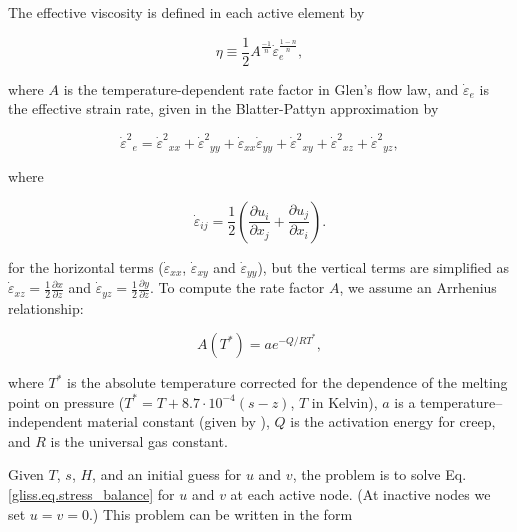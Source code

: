 The effective viscosity is defined in each active element by

\begin{equation}
  \label{gliss.eq.effective_viscosity}
  \eta \equiv \frac{1}{2} A^{\frac{-1}{n}} \dot{\varepsilon }_{e}^{\frac{1-n}{n}},
\end{equation}

\noindent
where $A$ is the temperature-dependent rate factor in Glen's flow law, and $\dot{\varepsilon }_{e}$ is the effective strain rate,
given in the Blatter-Pattyn approximation by 

\begin{equation}
  \label{gliss.eq.effective_strain_rate}
        {{\dot{\varepsilon }}^{2}}_{e}={{\dot{\varepsilon }}^{2}}_{xx}+{{\dot{\varepsilon }}^{2}}_{yy}+{{\dot{\varepsilon }}_{xx}}{{\dot{\varepsilon }}_{yy}}+{{\dot{\varepsilon }}^{2}}_{xy}+{{\dot{\varepsilon }}^{2}}_{xz}+{{\dot{\varepsilon }}^{2}}_{yz},
\end{equation}

\noindent
where

\begin{equation}
  \dot{\varepsilon }_{ij} = \frac{1}{2}\left( \frac{\partial u_{i}}{\partial x_{j}} + \frac{\partial u_{j}}{\partial x_{i}} \right).
\end{equation}

\noindent
for the horizontal terms ($\dot{\varepsilon}_{xx}$, $\dot{\varepsilon}_{xy}$ and $\dot{\varepsilon}_{yy}$),
but the vertical terms are simplified as
${\dot{\varepsilon }_{xz}}=\frac{1}{2}\frac{\partial x}{\partial z}$
and
${\dot{\varepsilon }_{yz}}=\frac{1}{2}\frac{\partial y}{\partial z}$.
To compute the rate factor $A$, we assume an Arrhenius relationship:

\begin{equation}
  \label{gliss.eq.arrhenius}
  A(T^{*})=a e^{-Q/RT^{*}},
\end{equation}

\noindent
where $T^{*}$ is the absolute temperature corrected for the dependence of the melting point
on pressure ($T^{*} = T + 8.7\cdot10^{-4} (s-z)$, $T$ in Kelvin),
$a$ is a temperature--independent material constant (given by \citet{PatersonBudd:1982}),
$Q$ is the activation energy for creep, and $R$ is the universal gas constant.

Given $T$, $s$, $H$, and an initial guess for $u$ and $v$, the problem is to solve Eq. \eqref{gliss.eq.stress_balance}
for $u$ and $v$ at each active node.  (At inactive nodes we set $u=v=0$.)  This problem can be written in the form

